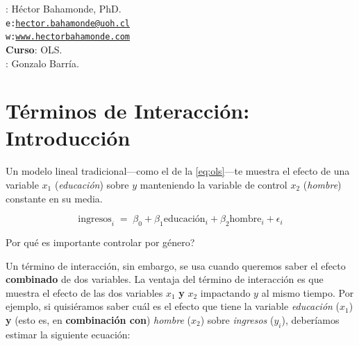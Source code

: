 \documentclass[onesided]{article}\usepackage[]{graphicx}\usepackage[]{color}
\begin{document}











\hspace{-5mm}{\bf Profesor}: H\'ector Bahamonde, PhD.\\
\texttt{e:}\href{mailto:hector.bahamonde@uoh.cl}{\texttt{hector.bahamonde@uoh.cl}}\\
\texttt{w:}\href{http://www.hectorbahamonde.com}{\texttt{www.hectorbahamonde.com}}\\
{\bf Curso}: OLS.\\
\hspace{-5mm}{\bf TA}: Gonzalo Barr\'ia.


\section*{T\'erminos de Interacci\'on: Introducci\'on}

Un modelo lineal tradicional---como el de la \autoref{eq:ols}---te muestra el efecto de una variable $x_{1}$ (\emph{educaci\'on}) sobre $y$ manteniendo la variable de control $x_{2}$ (\emph{hombre}) constante en su media. 

    \begin{equation}\label{eq:ols}
      \text{ingresos}_{i} \;=\; \beta_{0} + \beta_{1}\text{educaci\'on}_{i} + \beta_{2}\text{hombre}_{i} + \epsilon_{i}
    \end{equation}

{\color{red}Por qu\'e es importante controlar por g\'enero?}    

Un t\'ermino de interacci\'on, sin embargo, se usa cuando queremos saber el efecto {\bf combinado} de dos variables. La ventaja del t\'ermino de interacci\'on es que muestra el efecto de las dos variables  $x_{1}$ {\bf y}  $x_{2}$ impactando $y$ al mismo tiempo. Por ejemplo, si quisi\'eramos saber cu\'al es el efecto que tiene la variable \emph{educaci\'on} ($x_{1}$) {\bf y} (esto es, en {\bf combinaci\'on con}) \emph{hombre} ($x_{2}$) sobre \emph{ingresos} ($y_{i}$), deber\'iamos estimar la siguiente ecuaci\'on:
\end{document}
